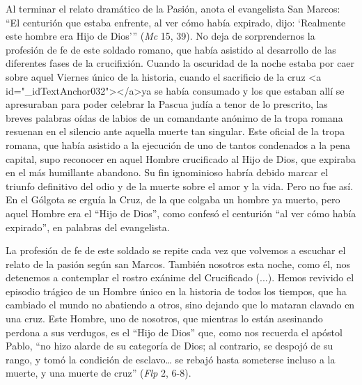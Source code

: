 			\begin{body} Al terminar el relato dramático de la Pasión, anota el evangelista San Marcos: “El centurión que estaba enfrente, al ver cómo había expirado, dijo: ‘Realmente este hombre era Hijo de Dios’” (\textit{Mc} 15, 39). No deja de sorprendernos la profesión de fe de este soldado romano, que había asistido al desarrollo de las diferentes fases de la crucifixión. Cuando la oscuridad de la noche estaba por caer sobre aquel Viernes único de la historia, cuando el sacrificio de la cruz <a id="_idTextAnchor032"></a>ya se había consumado y los que estaban allí se apresuraban para poder celebrar la Pascua judía a tenor de lo prescrito, las breves palabras oídas de labios de un comandante anónimo de la tropa romana resuenan en el silencio ante aquella muerte tan singular. Este oficial de la tropa romana, que había asistido a la ejecución de uno de tantos condenados a la pena capital, supo reconocer en aquel Hombre crucificado al Hijo de Dios, que expiraba en el más humillante abandono. Su fin ignominioso habría debido marcar el triunfo definitivo del odio y de la muerte sobre el amor y la vida. Pero no fue así. En el Gólgota se erguía la Cruz, de la que colgaba un hombre ya muerto, pero aquel Hombre era el “Hijo de Dios”, como confesó el centurión “al ver cómo había expirado”, en palabras del evangelista.\end{body}
			
			\begin{body}La profesión de fe de este soldado se repite cada vez que volvemos a escuchar el relato de la pasión según san Marcos. También nosotros esta noche, como él, nos detenemos a contemplar el rostro exánime del Crucificado (...). Hemos revivido el episodio trágico de un Hombre único en la historia de todos los tiempos, que ha cambiado el mundo no abatiendo a otros, sino dejando que lo mataran clavado en una cruz. Este Hombre, uno de nosotros, que mientras lo están asesinando perdona a sus verdugos, es el “Hijo de Dios” que, como nos recuerda el apóstol Pablo, “no hizo alarde de su categoría de Dios; al contrario, se despojó de su rango, y tomó la condición de esclavo… se rebajó hasta someterse incluso a la muerte, y una muerte de cruz” (\textit{Flp }2, 6-8).\end{body}
			
